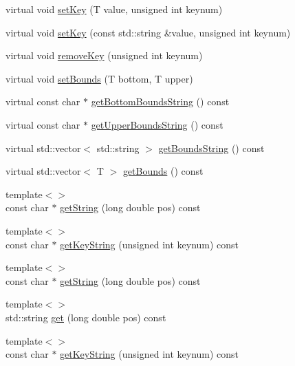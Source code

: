 \begin{DoxyCompactItemize}
\item 
virtual void \hyperlink{classmaudio_1_1SimpleKeyableProperty_a024814f5c80774c5de7c09d357b34950}{set\-Key} (T value, unsigned int keynum)
\item 
virtual void \hyperlink{classmaudio_1_1SimpleKeyableProperty_a432f634ff52d1e3eba39cfb6acda73c5}{set\-Key} (const std\-::string \&value, unsigned int keynum)
\item 
virtual void \hyperlink{classmaudio_1_1SimpleKeyableProperty_a19cb5ccd52244264ff4d53b97ebd081c}{remove\-Key} (unsigned int keynum)
\item 
virtual void \hyperlink{classmaudio_1_1SimpleKeyableProperty_a63db4ec0d5c4a289f2d20baed7587087}{set\-Bounds} (T bottom, T upper)
\item 
virtual const char $\ast$ \hyperlink{classmaudio_1_1SimpleKeyableProperty_ae3c62c7e501a8d50f1ac6220d381e7f5}{get\-Bottom\-Bounds\-String} () const 
\item 
virtual const char $\ast$ \hyperlink{classmaudio_1_1SimpleKeyableProperty_a9535fe9f61499c3b8cd79df11f7f461e}{get\-Upper\-Bounds\-String} () const 
\item 
virtual std\-::vector$<$ std\-::string $>$ \hyperlink{classmaudio_1_1SimpleKeyableProperty_a256a4b500e25f7a048d8f24280cfe893}{get\-Bounds\-String} () const 
\item 
virtual std\-::vector$<$ T $>$ \hyperlink{classmaudio_1_1SimpleKeyableProperty_a16365804a24594a466ed72ecdc3b8854}{get\-Bounds} () const 
\item 
{\footnotesize template$<$$>$ }\\const char $\ast$ \hyperlink{classmaudio_1_1SimpleKeyableProperty_a54bf26a66e66c717bc8cb3b64f830cab}{get\-String} (long double pos) const
\item 
{\footnotesize template$<$$>$ }\\const char $\ast$ \hyperlink{classmaudio_1_1SimpleKeyableProperty_a8a34984567fb8700030315bc23b1b900}{get\-Key\-String} (unsigned int keynum) const
\item 
{\footnotesize template$<$$>$ }\\const char $\ast$ \hyperlink{classmaudio_1_1SimpleKeyableProperty_ad65745f7a5dae9883621c385c87591fb}{get\-String} (long double pos) const
\item 
{\footnotesize template$<$$>$ }\\std\-::string \hyperlink{classmaudio_1_1SimpleKeyableProperty_ae7cb5d3b99c238d7d1b977c7e2a43774}{get} (long double pos) const
\item 
{\footnotesize template$<$$>$ }\\const char $\ast$ \hyperlink{classmaudio_1_1SimpleKeyableProperty_ac8459aea6d5685fa2a808ab7f13c4051}{get\-Key\-String} (unsigned int keynum) const

\end{DoxyCompactItemize}
